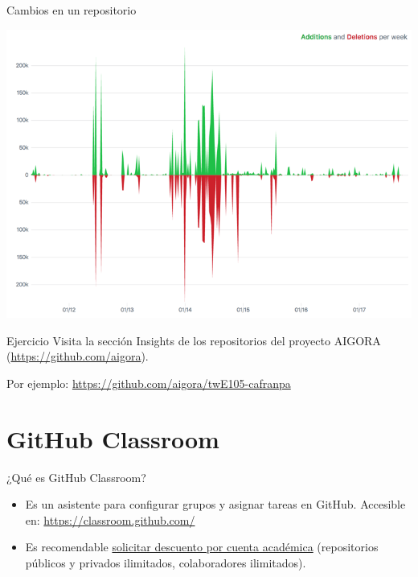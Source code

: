 \documentclass[xcolor={usenames,svgnames,dvipsnames}]{beamer}
\begin{document}
\begin{frame}[label={sec:org537fcf1}]{Cambios en un repositorio}
\begin{center}
\includegraphics[width=.9\linewidth]{figs/repo_code_frequency_graph_dotcom.png}
\end{center}
\end{frame}

\begin{frame}[label={sec:orgb3c2b0e}]{}
\begin{block}{Ejercicio}
Visita la sección Insights de los repositorios del proyecto AIGORA (\url{https://github.com/aigora}). 

Por ejemplo: \url{https://github.com/aigora/twE105-cafranpa}
\end{block}
\end{frame}

\section{GitHub Classroom}
\label{sec:org5d04e3c}

\begin{frame}[label={sec:org0c17fe7}]{¿Qué es GitHub Classroom?}
\begin{itemize}
\item Es un asistente para configurar grupos y asignar tareas en GitHub. Accesible en: \url{https://classroom.github.com/}

\item Es recomendable \href{https://help.github.com/en/articles/applying-for-an-educator-or-researcher-discount}{solicitar descuento por cuenta académica} (repositorios públicos y privados ilimitados, colaboradores ilimitados).
\end{itemize}
\end{frame}
\end{document}
